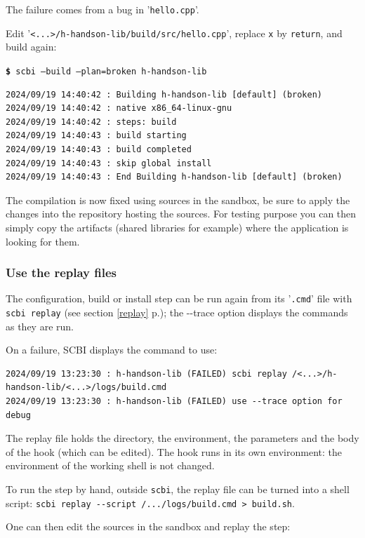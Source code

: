 \documentclass[a4paper,12pt,twoside]{article}
\newcommand{\code}[1]{\texttt{#1}}
\newcommand{\seeref}[1]{see section \ref{#1} p.\pageref{#1}}
\newcommand{\file}[1]{'{\texttt{#1}}'}
\newcommand{\cmd}[1]{\tabto{1cm}\hspace{0.5cm}\texttt{\textbf{\$} #1}}
\newcommand{\ddash}{-{}-}
\begin{document}
The failure comes from a bug in \file{hello.cpp}.

Edit \file{<...>/h-handson-lib/build/src/hello.cpp}, replace \code{x} by \code{return}, and build again:

\cmd{scbi --build --plan=broken h-handson-lib}

\begin{verbatim}
2024/09/19 14:40:42 : Building h-handson-lib [default] (broken)
2024/09/19 14:40:42 : native x86_64-linux-gnu
2024/09/19 14:40:42 : steps: build
2024/09/19 14:40:43 : build starting
2024/09/19 14:40:43 : build completed
2024/09/19 14:40:43 : skip global install
2024/09/19 14:40:43 : End Building h-handson-lib [default] (broken)
\end{verbatim}

The compilation is now fixed using sources in the sandbox, be sure to apply the changes into the repository hosting the sources. For testing purpose you can then simply copy the artifacts (shared libraries for example) where the application is looking for them.

\subsubsection{Use the replay files}

The configuration, build or install step can be run again from its
\file{.cmd} file with \code{scbi replay} (\seeref{replay}); the \ddash{}trace
option displays the commands as they are run.

On a failure, SCBI displays the command to use:

\begin{footnotesize}
	\begin{verbatim}
2024/09/19 13:23:30 : h-handson-lib (FAILED) scbi replay /<...>/h-handson-lib/<...>/logs/build.cmd
2024/09/19 13:23:30 : h-handson-lib (FAILED) use --trace option for debug
    \end{verbatim}
\end{footnotesize}

The replay file holds the directory, the environment, the parameters and
the body of the hook (which can be edited). The hook runs in its own
environment: the environment of the working shell is not changed.

To run the step by hand, outside \code{scbi}, the replay file can be
turned into a shell script: \code{scbi replay \ddash{}script
/.../logs/build.cmd > build.sh}.

One can then edit the sources in the sandbox and replay the step:
\end{document}
